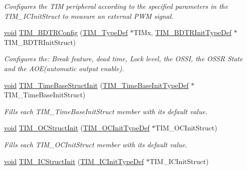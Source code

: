 \begin{DoxyCompactItemize}
\begin{DoxyCompactList}\small\item\em Configures the T\+IM peripheral according to the specified parameters in the T\+I\+M\+\_\+\+I\+C\+Init\+Struct to measure an external P\+WM signal. \end{DoxyCompactList}\item 
\hyperlink{usb__devapi_8h_afabf60e7f57651d6d595a02c75f07cd0}{void} \hyperlink{group___t_i_m___private___functions_ga3df4ba3f0727f63ce621e2b2e6035d4f}{T\+I\+M\+\_\+\+B\+D\+T\+R\+Config} (\hyperlink{struct_t_i_m___type_def}{T\+I\+M\+\_\+\+Type\+Def} $\ast$T\+I\+Mx, \hyperlink{struct_t_i_m___b_d_t_r_init_type_def}{T\+I\+M\+\_\+\+B\+D\+T\+R\+Init\+Type\+Def} $\ast$T\+I\+M\+\_\+\+B\+D\+T\+R\+Init\+Struct)
\begin{DoxyCompactList}\small\item\em Configures the\+: Break feature, dead time, Lock level, the O\+S\+SI, the O\+S\+SR State and the A\+O\+E(automatic output enable). \end{DoxyCompactList}\item 
\hyperlink{usb__devapi_8h_afabf60e7f57651d6d595a02c75f07cd0}{void} \hyperlink{group___t_i_m___private___functions_ga1556a0b9a5d53506875fd7de0cbc6b1f}{T\+I\+M\+\_\+\+Time\+Base\+Struct\+Init} (\hyperlink{struct_t_i_m___time_base_init_type_def}{T\+I\+M\+\_\+\+Time\+Base\+Init\+Type\+Def} $\ast$T\+I\+M\+\_\+\+Time\+Base\+Init\+Struct)
\begin{DoxyCompactList}\small\item\em Fills each T\+I\+M\+\_\+\+Time\+Base\+Init\+Struct member with its default value. \end{DoxyCompactList}\item 
\hyperlink{usb__devapi_8h_afabf60e7f57651d6d595a02c75f07cd0}{void} \hyperlink{group___t_i_m___private___functions_ga394683c78ae02837882e36014e11643e}{T\+I\+M\+\_\+\+O\+C\+Struct\+Init} (\hyperlink{struct_t_i_m___o_c_init_type_def}{T\+I\+M\+\_\+\+O\+C\+Init\+Type\+Def} $\ast$T\+I\+M\+\_\+\+O\+C\+Init\+Struct)
\begin{DoxyCompactList}\small\item\em Fills each T\+I\+M\+\_\+\+O\+C\+Init\+Struct member with its default value. \end{DoxyCompactList}\item 
\hyperlink{usb__devapi_8h_afabf60e7f57651d6d595a02c75f07cd0}{void} \hyperlink{group___t_i_m___private___functions_ga5005dac8e4e8a4c7fc2a0ef05b77cc50}{T\+I\+M\+\_\+\+I\+C\+Struct\+Init} (\hyperlink{struct_t_i_m___i_c_init_type_def}{T\+I\+M\+\_\+\+I\+C\+Init\+Type\+Def} $\ast$T\+I\+M\+\_\+\+I\+C\+Init\+Struct)

\end{DoxyCompactItemize}
